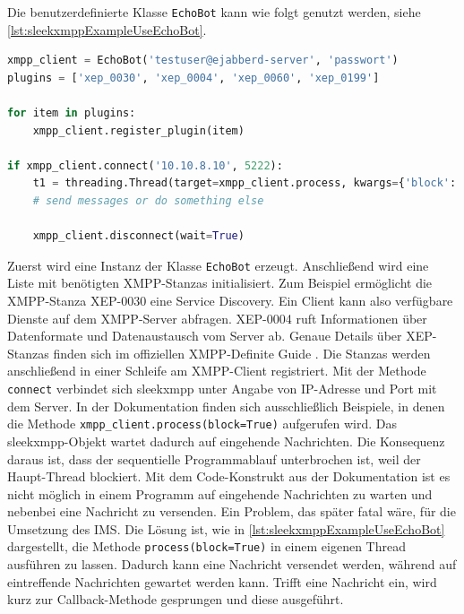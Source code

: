 \documentclass[a4paper,titlepage,halfparskip,12pt]{scrreprt}
\begin{document}
\begin{onehalfspacing}
Die benutzerdefinierte Klasse \texttt{EchoBot} kann wie folgt genutzt werden, siehe \autoref{lst:sleekxmppExampleUseEchoBot}.

\begin{lstlisting}[language=python, caption={Beispiel: Aufbau einer Verbindung zu einem \acs{XMPP}-Server mit sleekxmpp}, label={lst:sleekxmppExampleUseEchoBot}]
xmpp_client = EchoBot('testuser@ejabberd-server', 'passwort')
plugins = ['xep_0030', 'xep_0004', 'xep_0060', 'xep_0199']

for item in plugins:
    xmpp_client.register_plugin(item)

if xmpp_client.connect('10.10.8.10', 5222):
    t1 = threading.Thread(target=xmpp_client.process, kwargs={'block': True}, deamon=True)
    # send messages or do something else
    
    xmpp_client.disconnect(wait=True)
\end{lstlisting}

Zuerst wird eine Instanz der Klasse \texttt{EchoBot} erzeugt. Anschließend wird eine Liste mit benötigten \acs{XMPP}-Stanzas initialisiert. Zum Beispiel ermöglicht die \acs{XMPP}-Stanza XEP-0030 eine Service Discovery. Ein Client kann also verfügbare Dienste auf dem \acs{XMPP}-Server abfragen. XEP-0004 ruft Informationen über Datenformate und Datenaustausch vom Server ab. Genaue Details über XEP-Stanzas finden sich im offiziellen \acs{XMPP}-Definite Guide \cite{definiteGuideXMPP}. Die Stanzas werden anschließend in einer Schleife am \acs{XMPP}-Client registriert. Mit der Methode \texttt{connect} verbindet sich sleekxmpp unter Angabe von IP-Adresse und Port mit dem Server.  In der Dokumentation finden sich ausschließlich Beispiele, in denen die Methode \texttt{xmpp\_client.process(block=True)} aufgerufen wird. Das sleekxmpp-Objekt wartet dadurch auf eingehende Nachrichten. Die Konsequenz daraus ist, dass der sequentielle Programmablauf unterbrochen ist, weil der Haupt-Thread blockiert. Mit dem  Code-Konstrukt aus der Dokumentation ist es nicht möglich in einem Programm auf eingehende Nachrichten zu warten und nebenbei eine Nachricht zu versenden. Ein Problem, das später fatal wäre, für die Umsetzung des \acs{IMS}. Die Lösung ist, wie in \autoref{lst:sleekxmppExampleUseEchoBot} dargestellt, die Methode \texttt{process(block=True)} in einem eigenen Thread ausführen zu lassen. Dadurch kann eine Nachricht versendet werden, während auf eintreffende Nachrichten gewartet werden kann. Trifft eine Nachricht ein, wird kurz zur Callback-Methode gesprungen und diese ausgeführt.\cite{pythonSleekxmpp}


\end{onehalfspacing}
\end{document}
